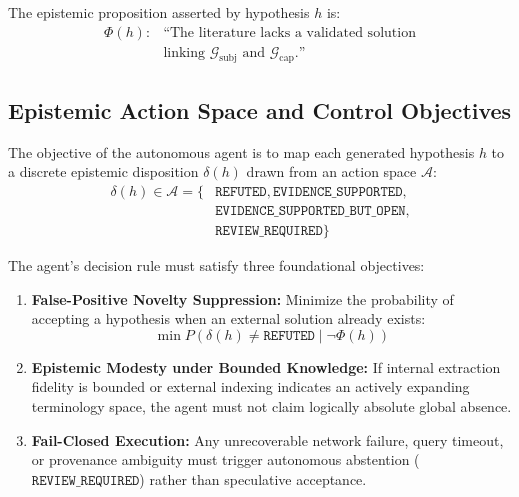 \documentclass[conference,10pt]{IEEEtran}
\begin{document}
The epistemic proposition asserted by hypothesis $h$ is:
\begin{equation}
\begin{aligned}
\Phi(h): &\text{``The literature lacks a validated solution} \\
         &\text{linking } \mathcal{G}_{\text{subj}} \text{ and } \mathcal{G}_{\text{cap}}.\text{''}
\end{aligned}
\end{equation}

\subsection{Epistemic Action Space and Control Objectives}
The objective of the autonomous agent is to map each generated hypothesis $h$ to a discrete epistemic disposition $\delta(h)$ drawn from an action space $\mathcal{A}$:
\begin{equation}
\begin{aligned}
\delta(h) \in \mathcal{A} = \{&\texttt{REFUTED}, \texttt{EVIDENCE\_SUPPORTED}, \\
&\texttt{EVIDENCE\_SUPPORTED\_BUT\_OPEN}, \\
&\texttt{REVIEW\_REQUIRED}\}
\end{aligned}
\end{equation}

The agent's decision rule must satisfy three foundational objectives:
\begin{enumerate}[label=\arabic*),leftmargin=1.8em]
  \item \textbf{False-Positive Novelty Suppression:} Minimize the probability of accepting a hypothesis when an external solution already exists:
    \begin{equation}
    \min P(\delta(h) \neq \texttt{REFUTED} \mid \neg \Phi(h))
    \end{equation}
  \item \textbf{Epistemic Modesty under Bounded Knowledge:} If internal extraction fidelity is bounded or external indexing indicates an actively expanding terminology space, the agent must not claim logically absolute global absence.
  \item \textbf{Fail-Closed Execution:} Any unrecoverable network failure, query timeout, or provenance ambiguity must trigger autonomous abstention ($\texttt{REVIEW\_REQUIRED}$) rather than speculative acceptance.
\end{enumerate}
\end{document}
